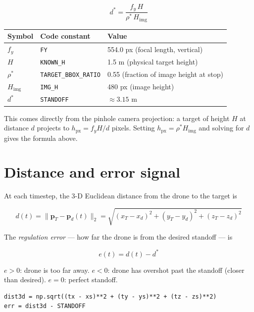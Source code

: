 \documentclass[11pt,a4paper]{article}
\begin{document}
\[
  \boxed{d^* = \frac{f_y \, H}{\rho^* \, H_{\mathrm{img}}}}
\]

\begin{center}
  \begin{tabular}{lll}
    \toprule
    Symbol & Code constant & Value \\
    \midrule
    $f_y$ & \texttt{FY} & 554.0 px (focal length, vertical) \\
    $H$ & \texttt{KNOWN\_H} & 1.5 m (physical target height) \\
    $\rho^*$ & \texttt{TARGET\_BBOX\_RATIO} & 0.55 (fraction of image height at stop) \\
    $H_{\mathrm{img}}$ & \texttt{IMG\_H} & 480 px (image height) \\
    $d^*$ & \texttt{STANDOFF} & $\approx 3.15$ m \\
    \bottomrule
  \end{tabular}
\end{center}

This comes directly from the pinhole camera projection:
a target of height $H$ at distance $d$ projects to
$h_{\mathrm{px}} = f_y H / d$ pixels.
Setting $h_{\mathrm{px}} = \rho^* H_{\mathrm{img}}$ and solving for $d$ gives the formula above.

\section{Distance and error signal}

At each timestep, the 3-D Euclidean distance from the drone to the target is

\[
  d(t) = \bigl\| \mathbf{p}_T - \mathbf{p}_d(t) \bigr\|_2
        = \sqrt{(x_T - x_d)^2 + (y_T - y_d)^2 + (z_T - z_d)^2}
\]

The \emph{regulation error} --- how far the drone is from the desired standoff
--- is

\[
  e(t) = d(t) - d^*
\]

$e > 0$: drone is too far away.
$e < 0$: drone has overshot past the standoff (closer than desired).
$e = 0$: perfect standoff.

\begin{lstlisting}
dist3d = np.sqrt((tx - xs)**2 + (ty - ys)**2 + (tz - zs)**2)
err = dist3d - STANDOFF
\end{lstlisting}

\end{document}
